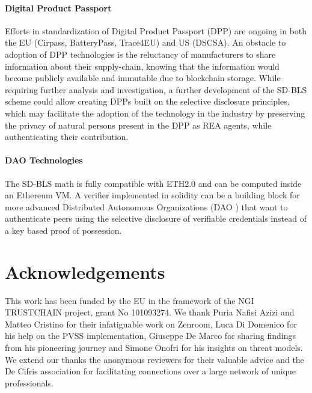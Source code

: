 \paragraph{Digital Product Passport}
Efforts in standardization of Digital Product Passport (DPP) are
ongoing in both the EU (Cirpass, BatteryPass, Trace4EU) and US
(DSCSA). An obstacle to adoption of DPP technologies is the reluctancy
of manufacturers to share information about their supply-chain,
knowing that the information would become publicly available and
immutable due to blockchain storage. While requiring further analysis
and investigation, a further development of the SD-BLS scheme could
allow creating DPPs built on the selective disclosure principles,
which may facilitate the adoption of the technology in the industry by
preserving the privacy of natural persons present in the DPP as REA
agents\cite{reflow}, while authenticating their contribution.

\paragraph{DAO Technologies}
The SD-BLS math is fully compatible with ETH2.0 and can be computed
inside an Ethereum VM. A verifier implemented in solidity can be a
building block for more advanced Distributed Autonomous Organizations
(DAO \cite{dao}) that want to authenticate peers using the selective
disclosure of verifiable credentials instead of a key based proof of
possession.


\section{Acknowledgements}
This work has been funded by the EU in the framework of the NGI
TRUSTCHAIN project, grant No 101093274. We thank Puria Nafisi Azizi
and Matteo Cristino for their infatiguable work on Zenroom, Luca Di
Domenico for his help on the PVSS implementation, Giuseppe De Marco
for sharing findings from his pioneering journey and Simone Onofri for
his insights on threat models. We extend our thanks the anonymous
reviewers for their valuable advice and the De Cifris association for
facilitating connections over a large network of unique professionals.





